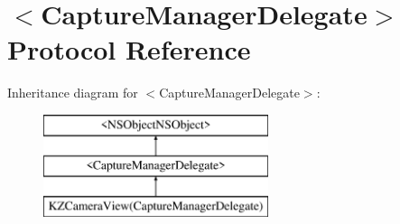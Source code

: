 \hypertarget{protocol_capture_manager_delegate-p}{}\section{$<$Capture\+Manager\+Delegate$>$ Protocol Reference}
\label{protocol_capture_manager_delegate-p}
Inheritance diagram for $<$Capture\+Manager\+Delegate$>$\+:\begin{figure}[H]
\begin{center}
\leavevmode
\includegraphics[height=3.000000cm]{protocol_capture_manager_delegate-p}
\end{center}
\end{figure}
